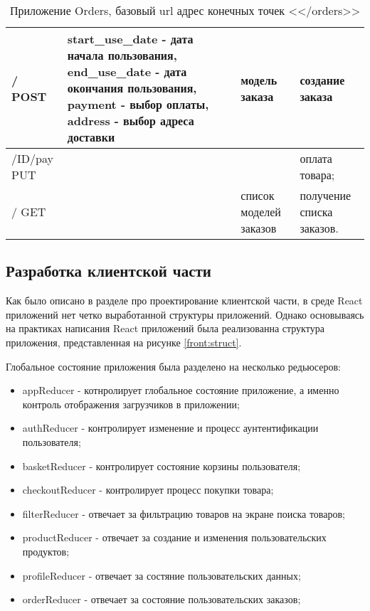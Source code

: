 \begin{table}
    \caption{Приложение Orders, базовый url адрес конечных точек <</orders>>}
    \begin{tabular}{ | p{3cm} | p{4cm} | p{3cm} | p{3cm} | }
        \hline
        / POST & start\_use\_date - дата начала пользования, end\_use\_date - дата окончания пользования, payment - выбор оплаты, address - выбор адреса доставки & модель заказа & создание заказа \\ \hline
        /ID/pay PUT & & & оплата товара; \\ \hline
        / GET & & список моделей заказов & получение списка заказов. \\ \hline
    \end{tabular}
\end{table}

\subsection{Разработка клиентской части}

Как было описано в разделе про проектирование клиентской части, в среде React приложений нет четко выработанной структуры приложений.
Однако основываясь на практиках написания React приложений была реализованна структура приложения, представленная на рисунке \ref{front:struct}.

Глобальное состояние приложения была разделено на несколько редьюсеров:
\begin{itemize}
    \item appReducer - котнролирует глобальное состояние приложение, а именно контроль отображения загрузчиков в приложении;
    \item authReducer - контролирует изменение и процесс аунтентификации пользователя;
    \item basketReducer - контролирует состояние корзины пользователя;
    \item checkoutReducer - контролирует процесс покупки товара;
    \item filterReducer - отвечает за фильтрацию товаров на экране поиска товаров;
    \item productReducer - отвечает за создание и изменения пользовательских продуктов;
    \item profileReducer - отвечает за состяние пользовательских данных;
    \item orderReducer - отвечает за состояние пользовательских заказов;
\end{itemize}

